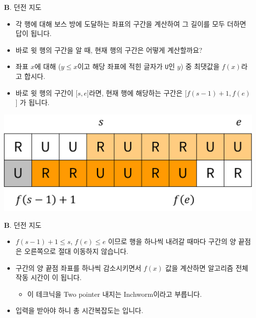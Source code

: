 \begin{frame}{\textbf{B}. 던전 지도}
    \vspace{14pt}
    \begin{itemize}
        \item 각 행에 대해 보스 방에 도달하는 좌표의 구간을 계산하여 그 길이를 모두 더하면 답이 됩니다.
        \item 바로 윗 행의 구간을 알 때, 현재 행의 구간은 어떻게 계산할까요?
        \item 좌표 $x$에 대해 ($y \le x$이고 해당 좌표에 적힌 글자가 \texttt{U}인 $y$) 중 최댓값을 $f(x)$라고 합시다.
        \item 바로 윗 행의 구간이 [$s, e$]라면, 현재 행에 해당하는 구간은 [$f(s-1)+1, f(e)$] 가 됩니다.
    \end{itemize}
    \begin{center}
        \includegraphics[width=0.5\linewidth]{../images/dungeon-map/b-calc.png}
    \end{center}
\end{frame}

\begin{frame}{\textbf{B}. 던전 지도}
    \begin{itemize}
        \item $f(s-1)+1 \le s$, $f(e) \le e$ 이므로 행을 하나씩 내려갈 때마다 구간의 양 끝점은 오른쪽으로 절대 이동하지 않습니다.
        \item 구간의 양 끝점 좌표를 하나씩 감소시키면서 $f(x)$ 값을 계산하면 알고리즘 전체 작동 시간이 이 됩니다.
        \begin{itemize}
            \item 이 테크닉을 Two pointer 내지는 Inchworm이라고 부릅니다.
        \end{itemize}
        \item 입력을 받아야 하니 총 시간복잡도는  입니다.
    \end{itemize}
\end{frame}
